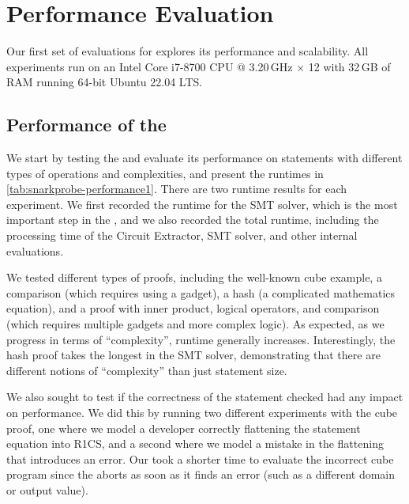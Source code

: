 \section{Performance Evaluation}
\label{sec:snarkprobe-evaluation}

Our first set of evaluations for \snarkprobe explores its performance and scalability.
All experiments run on an Intel Core i7-8700 CPU @ 3.20\,GHz $\times$ 12 with 32\,GB of RAM running 64-bit Ubuntu 22.04 LTS.

\subsection{Performance of the \ConstraintChecker}
We start by testing the \ConstraintChecker and evaluate its performance on statements with different types of operations and complexities, and present the runtimes in \autoref{tab:snarkprobe-performance1}.
There are two runtime results for each experiment.  We first recorded the runtime for the SMT solver, which is the most important step in the \ConstraintChecker, and we also recorded the total runtime, including the processing time of the Circuit Extractor, SMT solver, and other internal evaluations.

We tested different types of proofs, including the well-known cube example, a comparison (which requires using a gadget), a hash (a complicated mathematics equation), and a proof with inner product, logical operators, and comparison (which requires multiple gadgets and more complex logic). As expected, as we progress in terms of ``complexity'', runtime generally increases.  Interestingly, the hash proof takes the longest in the SMT solver, demonstrating that there are different notions of ``complexity'' than just statement size.


We also sought to test if the correctness of the statement checked had any impact on performance.  We did this by running two different experiments with the cube proof, one where we model a developer correctly flattening the statement equation into R1CS, and a second where we model a mistake in the flattening that introduces an error. Our \ConstraintChecker took a shorter time to evaluate the incorrect cube program since the \ConstraintChecker aborts as soon as it finds an error (such as a different domain or output value). 

